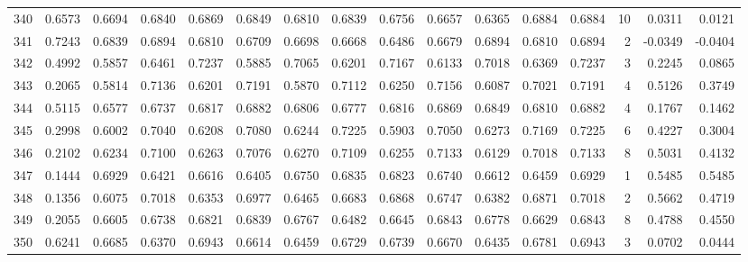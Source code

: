 \begin{tabular}{lrrrrrrrrrrrrrrr}
340 &      0.6573 &  0.6694 &  0.6840 &  0.6869 &  0.6849 &  0.6810 &  0.6839 &  0.6756 &  0.6657 &  0.6365 &   0.6884 &     0.6884 &     10 &                    0.0311 &                     0.0121 \\
341 &      0.7243 &  0.6839 &  0.6894 &  0.6810 &  0.6709 &  0.6698 &  0.6668 &  0.6486 &  0.6679 &  0.6894 &   0.6810 &     0.6894 &      2 &                   -0.0349 &                    -0.0404 \\
342 &      0.4992 &  0.5857 &  0.6461 &  0.7237 &  0.5885 &  0.7065 &  0.6201 &  0.7167 &  0.6133 &  0.7018 &   0.6369 &     0.7237 &      3 &                    0.2245 &                     0.0865 \\
343 &      0.2065 &  0.5814 &  0.7136 &  0.6201 &  0.7191 &  0.5870 &  0.7112 &  0.6250 &  0.7156 &  0.6087 &   0.7021 &     0.7191 &      4 &                    0.5126 &                     0.3749 \\
344 &      0.5115 &  0.6577 &  0.6737 &  0.6817 &  0.6882 &  0.6806 &  0.6777 &  0.6816 &  0.6869 &  0.6849 &   0.6810 &     0.6882 &      4 &                    0.1767 &                     0.1462 \\
345 &      0.2998 &  0.6002 &  0.7040 &  0.6208 &  0.7080 &  0.6244 &  0.7225 &  0.5903 &  0.7050 &  0.6273 &   0.7169 &     0.7225 &      6 &                    0.4227 &                     0.3004 \\
346 &      0.2102 &  0.6234 &  0.7100 &  0.6263 &  0.7076 &  0.6270 &  0.7109 &  0.6255 &  0.7133 &  0.6129 &   0.7018 &     0.7133 &      8 &                    0.5031 &                     0.4132 \\
347 &      0.1444 &  0.6929 &  0.6421 &  0.6616 &  0.6405 &  0.6750 &  0.6835 &  0.6823 &  0.6740 &  0.6612 &   0.6459 &     0.6929 &      1 &                    0.5485 &                     0.5485 \\
348 &      0.1356 &  0.6075 &  0.7018 &  0.6353 &  0.6977 &  0.6465 &  0.6683 &  0.6868 &  0.6747 &  0.6382 &   0.6871 &     0.7018 &      2 &                    0.5662 &                     0.4719 \\
349 &      0.2055 &  0.6605 &  0.6738 &  0.6821 &  0.6839 &  0.6767 &  0.6482 &  0.6645 &  0.6843 &  0.6778 &   0.6629 &     0.6843 &      8 &                    0.4788 &                     0.4550 \\
350 &      0.6241 &  0.6685 &  0.6370 &  0.6943 &  0.6614 &  0.6459 &  0.6729 &  0.6739 &  0.6670 &  0.6435 &   0.6781 &     0.6943 &      3 &                    0.0702 &                     0.0444 \\

\end{tabular}
